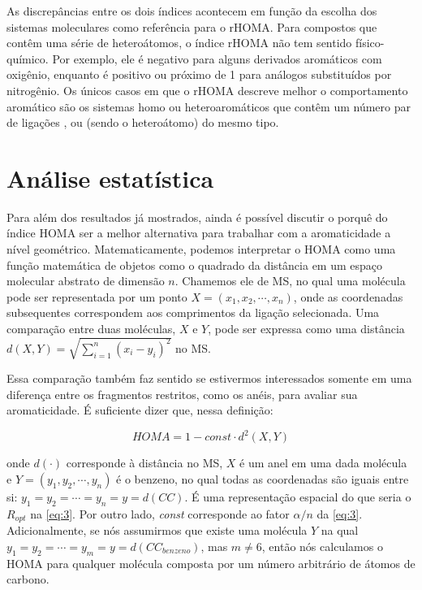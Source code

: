 As discrepâncias entre os dois índices acontecem em função da escolha dos sistemas moleculares como referência para o \gls{rHOMA}. Para compostos que contêm uma série de heteroátomos, o índice \gls{rHOMA} não tem sentido físico-químico. Por exemplo, ele é negativo para alguns derivados aromáticos com oxigênio, enquanto é positivo ou próximo de 1 para análogos substituídos por nitrogênio. Os únicos casos em que o \gls{rHOMA} descreve melhor o comportamento aromático são os sistemas homo ou heteroaromáticos que contêm um número par de ligações ,  ou  (sendo  o heteroátomo) do mesmo tipo.

\section{Análise estatística}

Para além dos resultados já mostrados, ainda é possível discutir o porquê do índice \gls{HOMA} ser a melhor alternativa para trabalhar com a aromaticidade a nível geométrico. Matematicamente, podemos interpretar o \gls{HOMA} como uma função matemática de objetos como o quadrado da distância em um espaço molecular abstrato de dimensão $n$. Chamemos ele de \gls{MS}, no qual uma molécula pode ser representada por um ponto $X = (x_1, x_2, \cdots, x_n)$, onde as coordenadas subsequentes correspondem aos comprimentos da ligação  selecionada. Uma comparação entre duas moléculas, $X$ e $Y$, pode ser expressa como uma distância $d(X, Y) = \displaystyle \sqrt{\sum_{i=1}^{n} (x_i - y_i)^2}$ no \gls{MS}. 

Essa comparação também faz sentido se estivermos interessados somente em uma diferença entre os fragmentos restritos, como os anéis, para avaliar sua aromaticidade. É suficiente dizer que, nessa definição:

\begin{equation}
    HOMA = 1 - \textit{const} \cdot d^2(X, Y)
\end{equation}

\noindent onde $d(\cdot)$ corresponde à distância no \gls{MS}, $X$ é um anel em uma dada molécula e $Y = (y_1, y_2, \cdots, y_n)$ é o benzeno, no qual todas as coordenadas são iguais entre si: $y_1 = y_2 = \cdots = y_n = y = d(CC)$. É uma representação espacial do que seria o $R_{opt}$ na \autoref{eq:3}. Por outro lado, \textit{const} corresponde ao fator $\alpha / n$ da \autoref{eq:3}. Adicionalmente, se nós assumirmos que existe uma molécula $Y$ na qual $y_1 = y_2 = \cdots = y_m = y = d(CC_{benzeno})$, mas $m \neq 6$, então nós calculamos o \gls{HOMA} para qualquer molécula composta por um número arbitrário de átomos de carbono.

